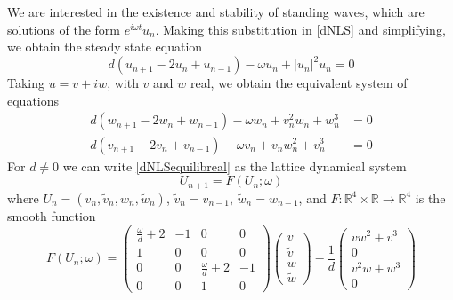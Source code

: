 \documentclass[12pt]{article}
\def\R{{\mathbb R}}
\begin{document}
We are interested in the existence and stability of standing waves, which are solutions of the form $e^{i \omega t}u_n$. Making this substitution in \eqref{dNLS} and simplifying, we obtain the steady state equation
\begin{equation}\label{dNLSequilib}
d(u_{n+1} - 2 u_n + u_{n-1}) - \omega u_n + |u_n|^2 u_n = 0
\end{equation}
Taking $u = v + i w$, with $v$ and $w$ real, we obtain the equivalent system of equations
\begin{equation}\label{dNLSequilibreal}
\begin{aligned}
d (w_{n+1} - 2 w_n + w_{n-1}) - \omega w_n + v_n^2 w_n + w_n^3 &= 0 \\
d (v_{n+1} - 2 v_n + v_{n-1}) - \omega v_n + v_n w_n^2 + v_n^3 &= 0
\end{aligned}
\end{equation}
For $d \neq 0$ we can write \eqref{dNLSequilibreal} as the lattice dynamical system
\begin{equation}\label{DNLSlattice1}
U_{n+1} = F(U_n; \omega)
\end{equation}
where $U_n = (v_n, \tilde{v}_n, w_n, \tilde{w}_n)$, $\tilde{v}_n = v_{n-1}$, $\tilde{w}_n = w_{n-1}$, and $F:\R^4 \times \R \rightarrow \R^4$ is the smooth function
\begin{equation}\label{FdNLS}
F(U_n; \omega) =
\begin{pmatrix}
\frac{\omega}{d} + 2 & -1 & 0 & 0 \\
1 & 0 & 0 & 0 \\
0 & 0 & \frac{\omega}{d} + 2 & -1 \\
0 & 0 & 1 & 0
\end{pmatrix}
\begin{pmatrix}
v \\ \tilde{v} \\ w \\ \tilde{w}
\end{pmatrix}
- \frac{1}{d} 
\begin{pmatrix}
v w^2 + v^3 \\ 0 \\ v^2 w + w^3 \\ 0
\end{pmatrix}
\end{equation}
\end{document}
